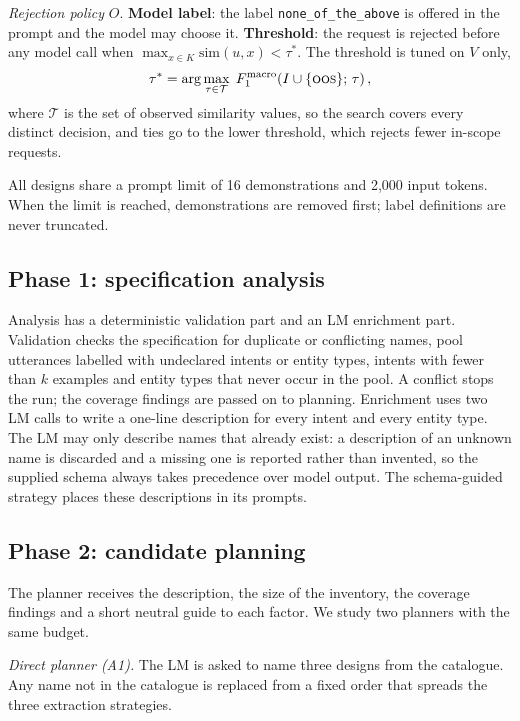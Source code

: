 \documentclass[conference]{IEEEtran}
\newcommand{\oos}{\textsc{oos}}
\begin{document}
\emph{Rejection policy} $O$. \textbf{Model label}: the label \texttt{none\_of\_the\_above} is offered in the prompt and the model may choose it. \textbf{Threshold}: the request is rejected before any model call when $\max_{x\in K}\mathrm{sim}(u,x)<\tau^{*}$. The threshold is tuned on $V$ only,
\begin{equation}
\tau^{*}=\arg\max_{\tau\in\mathcal{T}} \; F_1^{\text{macro}}\!\left(I\cup\{\oos\};\,\tau\right),
\end{equation}
where $\mathcal{T}$ is the set of observed similarity values, so the search covers every distinct decision, and ties go to the lower threshold, which rejects fewer in-scope requests.

All designs share a prompt limit of 16 demonstrations and 2{,}000 input tokens. When the limit is reached, demonstrations are removed first; label definitions are never truncated.

\subsection{Phase 1: specification analysis}

Analysis has a deterministic validation part and an LM enrichment part. Validation checks the specification for duplicate or conflicting names, pool utterances labelled with undeclared intents or entity types, intents with fewer than $k$ examples and entity types that never occur in the pool. A conflict stops the run; the coverage findings are passed on to planning. Enrichment uses two LM calls to write a one-line description for every intent and every entity type. The LM may only describe names that already exist: a description of an unknown name is discarded and a missing one is reported rather than invented, so the supplied schema always takes precedence over model output. The schema-guided strategy places these descriptions in its prompts.

\subsection{Phase 2: candidate planning}

The planner receives the description, the size of the inventory, the coverage findings and a short neutral guide to each factor. We study two planners with the same budget.

\emph{Direct planner (A1).} The LM is asked to name three designs from the catalogue. Any name not in the catalogue is replaced from a fixed order that spreads the three extraction strategies.
\end{document}
